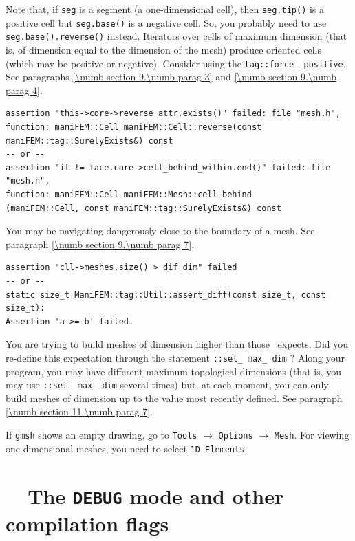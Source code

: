 Note that, if {\small\tt seg} is a segment (a one-dimensional cell), then
{\small\tt seg.tip()} is a positive cell but {\small\tt seg.base()} is a negative cell.
So, you probably need to use {\small\tt seg.base().reverse()} instead.
Iterators over cells of maximum dimension (that is, of dimension equal to the dimension
of the mesh) produce oriented cells (which may be positive or negative).
Consider using the {\small\tt\textcolor{tag}{tag}::force\_\,positive}.
See paragraphs \ref{\numb section 9.\numb parag 3} and \ref{\numb section 9.\numb parag 4}.

\begin{Verbatim}[commandchars=\\\{\},formatcom=\small\tt,baselinestretch=0.94]
assertion "this->core->reverse_attr.exists()" failed: file "mesh.h",
function: maniFEM::Cell maniFEM::Cell::reverse(const maniFEM::tag::SurelyExists&) const
-- or --
assertion "it != face.core->cell_behind_within.end()" failed: file "mesh.h",
function: maniFEM::Cell maniFEM::Mesh::cell_behind
(maniFEM::Cell, const maniFEM::tag::SurelyExists&) const
\end{Verbatim}

You may be navigating dangerously close to the boundary of a mesh.
See paragraph \ref{\numb section 9.\numb parag 7}.

\begin{Verbatim}[commandchars=\\\{\},formatcom=\small\tt,baselinestretch=0.94]
assertion "cll->meshes.size() > dif_dim" failed
-- or --
static size_t ManiFEM::tag::Util::assert_diff(const size_t, const size_t):
Assertion 'a >= b' failed.
\end{Verbatim}

You are trying to build meshes of dimension higher than those \maniFEM\ expects.
Did you re-define this expectation through the statement
{\small\tt{}::set\_\,max\_\,dim} ?
Along your program, you may have different maximum topological dimensions (that is,
you may use {\small\tt{}::set\_\,max\_\,dim} several times) but, at each moment,
you can only build meshes of dimension up to the value most recently defined.
See paragraph \ref{\numb section 11.\numb parag 7}.
\medskip

If {\small\tt gmsh} shows an empty drawing, go to {\small\tt Tools} $\to$ {\small\tt Options} $\to$
{\small\tt Mesh}.
For viewing one-dimensional meshes, you need to select {\small\tt 1D Elements}.


\section{~~The {\tt DEBUG} mode and other compilation flags}
\label{\numb section 11.\numb parag 15}

